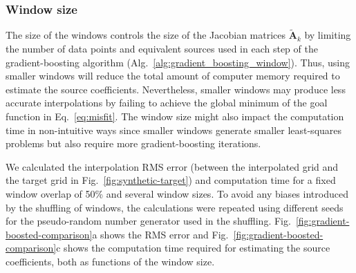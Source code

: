 \subsubsection{Window size}
\label{sec:window_size}

The size of the windows controls the size of the Jacobian matrices
$\tilde{\mathbf{A}}_k$ by limiting the number of data points and equivalent
sources used in each step of the gradient-boosting algorithm
(Alg.~\ref{alg:gradient_boosting_window}).
Thus, using smaller windows will reduce the total amount of computer memory
required to estimate the source coefficients.
Nevertheless, smaller windows may produce less accurate interpolations by
failing to achieve the global minimum of the goal function in
Eq.~\ref{eq:misfit}.
The window size might also impact the computation time in non-intuitive ways
since smaller windows generate smaller least-squares problems but also require
more gradient-boosting iterations.

We calculated the interpolation RMS error (between the interpolated grid and
the target grid in Fig.~\ref{fig:synthetic-target}) and computation time for a
fixed window overlap of 50\% and several window sizes.
To avoid any biases introduced by the shuffling of windows, the calculations
were repeated using different seeds for the pseudo-random number generator used
in the shuffling.
Fig.~\ref{fig:gradient-boosted-comparison}a shows the RMS error and
Fig.~\ref{fig:gradient-boosted-comparison}c shows the computation time
required for estimating the source coefficients, both as functions of
the window size.

